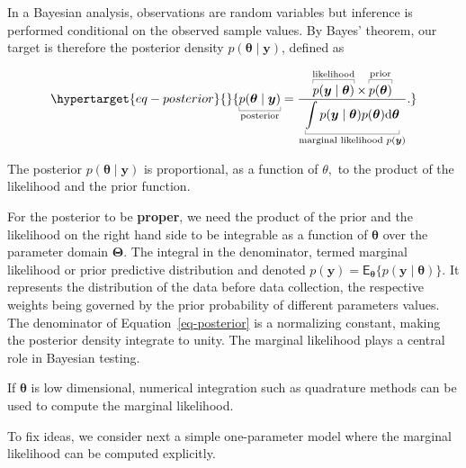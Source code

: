 \documentclass[
  11pt,
  letterpaper,
]{scrbook}
\theoremstyle{definition}
\theoremstyle{definition}
\theoremstyle{definition}
\theoremstyle{plain}
\theoremstyle{remark}
\begin{document}
In a Bayesian analysis, observations are random variables but inference
is performed conditional on the observed sample values. By Bayes'
theorem, our target is therefore the posterior density
\(p(\boldsymbol{\theta} \mid \boldsymbol{y})\), defined as

\begin{equation}\protect\hypertarget{eq-posterior}{}{
\underbracket[0.25pt]{p(\boldsymbol{\theta} \mid \boldsymbol{y})}_{\text{posterior}} = \frac{\overbracket[0.25pt]{p(\boldsymbol{y} \mid \boldsymbol{\theta})}^{\text{likelihood}} \times  \overbracket[0.25pt]{p(\boldsymbol{\theta})}^{\text{prior}}}{\underbracket[0.25pt]{\int p(\boldsymbol{y} \mid \boldsymbol{\theta}) p(\boldsymbol{\theta}) \mathrm{d} \boldsymbol{\theta}}_{\text{marginal likelihood }p(\boldsymbol{y})}}.
}\label{eq-posterior}\end{equation}

The posterior \(p(\boldsymbol{\theta} \mid \boldsymbol{y})\) is
proportional, as a function of \(\theta,\) to the product of the
likelihood and the prior function.

For the posterior to be \textbf{proper}, we need the product of the
prior and the likelihood on the right hand side to be integrable as a
function of \(\boldsymbol{\theta}\) over the parameter domain
\(\boldsymbol{\Theta}\). The integral in the denominator, termed
marginal likelihood or prior predictive distribution and denoted
\(p(\boldsymbol{y}) = \mathsf{E}_{\boldsymbol{\theta}}\{p(\boldsymbol{y} \mid \boldsymbol{\theta})\}\).
It represents the distribution of the data before data collection, the
respective weights being governed by the prior probability of different
parameters values. The denominator of Equation~\ref{eq-posterior} is a
normalizing constant, making the posterior density integrate to unity.
The marginal likelihood plays a central role in Bayesian testing.

If \(\boldsymbol{\theta}\) is low dimensional, numerical integration
such as quadrature methods can be used to compute the marginal
likelihood.

To fix ideas, we consider next a simple one-parameter model where the
marginal likelihood can be computed explicitly.
\end{document}
